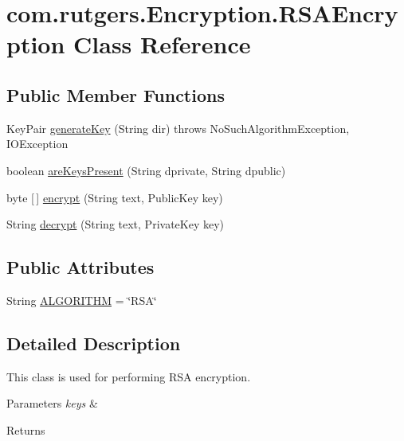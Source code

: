 \hypertarget{classcom_1_1rutgers_1_1Encryption_1_1RSAEncryption}{}\section{com.\+rutgers.\+Encryption.\+R\+S\+A\+Encryption Class Reference}
\label{classcom_1_1rutgers_1_1Encryption_1_1RSAEncryption}
\subsection*{Public Member Functions}
\begin{DoxyCompactItemize}
\item 
Key\+Pair \hyperlink{classcom_1_1rutgers_1_1Encryption_1_1RSAEncryption_a2e8b6932d8e1bd34a9685933e53f281d}{generate\+Key} (String dir)  throws No\+Such\+Algorithm\+Exception, I\+O\+Exception 
\item 
boolean \hyperlink{classcom_1_1rutgers_1_1Encryption_1_1RSAEncryption_ae21caf1725128ffba0c83a26e88eea29}{are\+Keys\+Present} (String dprivate, String dpublic)
\item 
byte \mbox{[}$\,$\mbox{]} \hyperlink{classcom_1_1rutgers_1_1Encryption_1_1RSAEncryption_a9f7c838a3839c09c1899ab7504999319}{encrypt} (String text, Public\+Key key)
\item 
String \hyperlink{classcom_1_1rutgers_1_1Encryption_1_1RSAEncryption_ab590564086c4a7fb7b528ec5a8736407}{decrypt} (String text, Private\+Key key)
\end{DoxyCompactItemize}
\subsection*{Public Attributes}
\begin{DoxyCompactItemize}
\item 
String \hyperlink{classcom_1_1rutgers_1_1Encryption_1_1RSAEncryption_a4bb698f85fd1a2ed91a697473c71c405}{A\+L\+G\+O\+R\+I\+T\+HM} = \char`\"{}R\+SA\char`\"{}
\end{DoxyCompactItemize}


\subsection{Detailed Description}
This class is used for performing R\+SA encryption. 
\begin{DoxyParams}{Parameters}
{\em keys} & \\
\hline
\end{DoxyParams}
\begin{DoxyReturn}{Returns}

\end{DoxyReturn}


